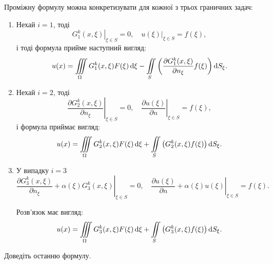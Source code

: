 Проміжну формулу можна конкретизувати для кожної з трьох граничних задач:
\begin{enumerate}
	\item Нехай $i = 1$, тоді
	\begin{equation}
		\left. G_1^k(x, \xi) \right|_{\xi \in S} = 0, \quad \left. u(\xi) \right|_{\xi \in S} = f(\xi),
	\end{equation}
	і тоді формула прийме наступний вигляд:
	\begin{equation}
		u(x) = \displaystyle\iiint\limits_\Omega G_1^k(x, \xi) F(\xi) \mathop{}\!\mathrm{d} \xi - \displaystyle\iint\limits_S \left( \frac{\partial G_1^k(x, \xi)}{\partial n_\xi} f(\xi) \right) \mathop{}\!\mathrm{d} S_\xi.
	\end{equation}

	\item Нехай $i = 2$, тоді 
	\begin{equation}
		\left. \frac{\partial G_2^k(x, \xi)}{\partial n_\xi} \right|_{\xi \in S} = 0, \quad \left. \frac{\partial u(\xi)}{\partial n} \right|_{\xi \in S} = f(\xi),
	\end{equation}
	і формула приймає вигляд:
	\begin{equation}
		u(x) = \displaystyle\iiint\limits_\Omega G_2^k(x, \xi) F(\xi) \mathop{}\!\mathrm{d} \xi + \displaystyle\iint\limits_S \left( G_2^k(x, \xi) f(\xi) \right) \mathop{}\!\mathrm{d} S_\xi.
	\end{equation}

	\item У випадку $i = 3$
	\begin{equation}
		\left. \frac{\partial G_3^k(x, \xi)}{\partial n_\xi} + \alpha(\xi) G_3^k(x, \xi) \right|_{\xi \in S} = 0, \quad \left. \frac{\partial u(\xi)}{\partial n} + \alpha(\xi) u(\xi) \right|_{\xi \in S} = f(\xi).
	\end{equation}

	Розв'язок має вигляд:
	\begin{equation}
		u(x) = \displaystyle\iiint\limits_\Omega G_3^k(x, \xi) F(\xi) \mathop{}\!\mathrm{d} \xi + \displaystyle\iint\limits_S \left( G_3^k(x, \xi) f(\xi) \right) \mathop{}\!\mathrm{d} S_\xi.
	\end{equation}
\end{enumerate}

\begin{exercise}
	Доведіть останню формулу.
\end{exercise}

